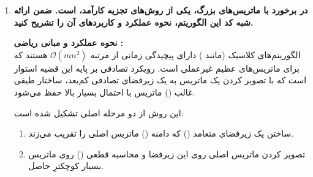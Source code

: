 \documentclass{article}
\begin{document}
\begin{enumerate}
    \vspace{0.3cm}
    \textbf{تحلیل ضرورت اعمال استانداردسازی پیش از تجزیه ():} \\
    تجزیه مقادیر تکین () معادل با یافتن بردارهای ویژه ماتریس کوواریانس (یا ماتریس گرام $X^T X$) است. الگوریتم  ذاتا به دنبال جهت‌هایی در فضای ویژگی می‌گردد که \textbf{بیشترین پراکندگی (واریانس)} را در امتداد خود دارند.
    \begin{enumerate}
        \item \textbf{جلوگیری از تسلط مقیاس‌های بزرگ :} اگر یک ویژگی دامنه عددی بزرگی داشته باشد (مثلاً واحد اندازه گیری به میلیون باشد) و ویژگی دیگر کوچک باشد (مثلاً بین ۰ تا ۱)، ویژگی اول واریانس بسیار بزرگی تولید می‌کند. در نتیجه،  اولین بردار تکین راست ($V_1$) را تقریباً موازی با محور ویژگی اول قرار می‌دهد و ساختار واقعی داده‌ها نادیده گرفته می‌شود.
        \item \textbf{ایزوتراپیک کردن فضا :} استانداردسازی باعث می‌شود مقیاس تمامی ویژگی‌ها هم‌ارز شود تا بردارهای تکین استخراج‌شده، صرفاً بر اساس \textit{همبستگی ()} واقعی میان متغیرها تعیین شوند، نه بر اساس \textit{واحد اندازه‌گیری} آن‌ها.
    \end{enumerate}

    \vspace{0.5cm}
    \item \textbf{در برخورد با ماتریس‌های بزرگ، یکی از روش‌های تجزیه کارآمد،  است. ضمن ارائه شبه کد این الگوریتم، نحوه عملکرد و کاربردهای آن را تشریح کنید.}

    \vspace{0.3cm}
    \textbf{نحوه عملکرد و مبانی ریاضی :} \\
    الگوریتم‌های کلاسیک  (مانند ) دارای پیچیدگی زمانی از مرتبه $\mathcal{O}(m n^2)$ هستند که برای ماتریس‌های عظیم غیرعملی است. رویکرد تصادفی بر پایه این قضیه استوار است که با تصویر کردن یک ماتریس به یک زیرفضای تصادفی کم‌بعد، ساختار طیفی غالب () ماتریس با احتمال بسیار بالا حفظ می‌شود.
    
    این روش از دو مرحله اصلی تشکیل شده است:
    \begin{enumerate}
        \item ساختن یک زیرفضای متعامد () که دامنه () ماتریس اصلی را تقریب می‌زند.
        \item تصویر کردن ماتریس اصلی روی این زیرفضا و محاسبه  قطعی () روی ماتریس بسیار کوچکترِ حاصل.
    \end{enumerate}


\end{enumerate}
\end{document}
